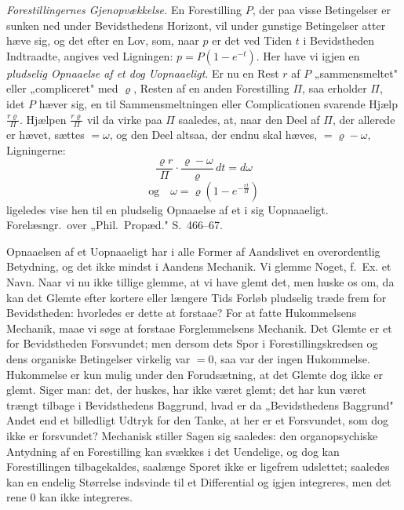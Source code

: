\documentclass[12pt]{book}
\newcommand{\opage}[1]{\marginnote{\footnotesize\textit{[#1]}}}
\begin{document}
{\emph{Forestillingernes Gjenopvækkelse.} En Forestilling $P$, der paa visse Betingelser er sunken ned
under Bevidsthedens Horizont, vil under gunstige Betingelser atter hæve sig, og det efter en Lov, som,
naar $p$ er det ved Tiden $t$ i Bevidstheden Indtraadte, angives ved Ligningen: $p = P(1 - e^{-t})$.
Her have vi igjen en \emph{pludselig Opnaaelse af et dog Uopnaaeligt}. Er nu en Rest $r$ af $P$
„sammensmeltet" eller „compliceret" med $\varrho$, Resten af en anden Forestilling $\Pi$, saa erholder
$\Pi$, idet $P$ hæver sig, en til Sammensmeltningen eller Complicationen svarende Hjælp
$\frac{r\varrho}{\Pi}$. Hjælpen $\frac{r\varrho}{\Pi}$ vil da virke paa $\Pi$ saaledes, at, naar den
Deel af $\Pi$, der allerede er hævet, sættes $= \omega$, og den Deel altsaa, der endnu skal hæves, $=
\varrho - \omega$, Ligningerne:
\[ \frac{\varrho r}{\Pi} \cdot \frac{\varrho - \omega}{\varrho}\,dt = d\omega \]
\[ \text{og}\quad \omega = \varrho\left(1 - e^{-\frac{rt}{\Pi}}\right) \]
ligeledes vise hen til en pludselig Opnaaelse af et i sig Uopnaaeligt. Forelæsngr.\ over „Phil.\
Propæd." S.~466--67.}

\opage{421} Opnaaelsen af et Uopnaaeligt har i alle Former af Aandslivet en overordentlig Betydning, og det ikke
mindst i Aandens Mechanik. Vi glemme Noget, f.\ Ex. et Navn. Naar vi nu ikke tillige glemme, at vi
have glemt det, men huske os om, da kan det Glemte efter kortere eller længere Tids Forløb pludselig
træde frem for Bevidstheden: hvorledes er dette at forstaae? For at fatte Hukommelsens Mechanik, maae
vi søge at forstaae Forglemmelsens Mechanik. Det Glemte er et for Bevidstheden Forsvundet; men dersom
dets Spor i Forestillingskredsen og dens organiske Betingelser
\opage{422} virkelig var $= 0$, saa var der ingen Hukommelse. Hukommelse er kun mulig under den Forudsætning, at
det Glemte dog ikke er glemt. Siger man: det, der huskes, har ikke været glemt; det har kun været
trængt tilbage i Bevidsthedens Baggrund, hvad er da „Bevidsthedens Baggrund" Andet end et billedligt
Udtryk for den Tanke, at her er et Forsvundet, som dog ikke er forsvundet? Mechanisk stiller Sagen
sig saaledes: den organopsychiske Antydning af en Forestilling kan svækkes i det Uendelige, og dog
kan Forestillingen tilbagekaldes, saalænge Sporet ikke er ligefrem udslettet; saaledes kan en endelig
Størrelse indsvinde til et Differential og igjen integreres, men det rene $0$ kan ikke integreres.
\end{document}
